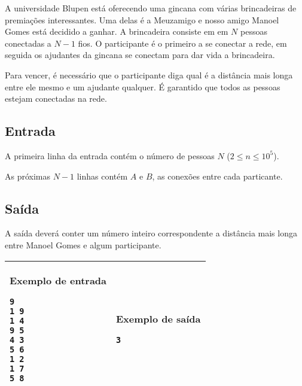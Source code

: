A universidade Blupen está oferecendo uma gincana com várias brincadeiras 
de premiações interessantes. Uma delas é a Meuzamigo e nosso amigo 
Manoel Gomes está decidido a ganhar. A brincadeira consiste em
em $N$ pessoas conectadas a $N-1$ fios. O participante é o primeiro a se conectar a rede,
em seguida os ajudantes da gincana se conectam para dar vida a brincadeira. 

Para vencer, é necessário que o participante 
diga qual é a distância mais longa entre ele mesmo e um ajudante qualquer. 
É garantido que todos as pessoas estejam conectadas na rede.

\subsection*{Entrada}
 
A primeira linha da entrada contém o número de pessoas $N$ ($2\leq n\leq 10^5$).
 
As próximas $N-1$ linhas contém $A$ e $B$, as conexões entre cada particante.
 
\subsection*{Saída}
A saída deverá conter um número inteiro correspondente a distância mais longa
entre Manoel Gomes e algum participante.

\begin{table}[!h]
\centering
\begin{tabular}{|l|l|}
\hline
\begin{minipage}[t]{3in}
\textbf{Exemplo de entrada}
\begin{verbatim}
9
1 9
1 4
9 5
4 3
5 6
1 2
1 7
5 8
\end{verbatim}
\vspace{1mm}
\end{minipage}
&
\begin{minipage}[t]{3in}
\textbf{Exemplo de saída}
\begin{verbatim}
3
\end{verbatim}
\vspace{1mm}
\end{minipage} \\
\hline
\end{tabular}
\end{table}

